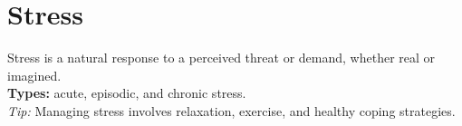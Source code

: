 \section*{Stress}
Stress is a natural response to a perceived threat or demand, whether real or imagined.\\
\textbf{Types:} acute, episodic, and chronic stress.\\
\textit{Tip:} Managing stress involves relaxation, exercise, and healthy coping strategies.\\ 